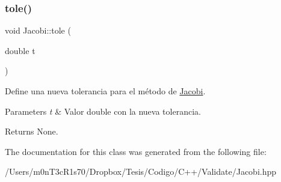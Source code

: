\subsubsection{\texorpdfstring{tole()}{tole()}}
{\footnotesize\ttfamily void Jacobi\+::tole (\begin{DoxyParamCaption}\item[{double}]{t }\end{DoxyParamCaption})\hspace{0.3cm}{\ttfamily [inline]}}



Define una nueva tolerancia para el método de \hyperlink{class_jacobi}{Jacobi}. 


\begin{DoxyParams}{Parameters}
{\em t} & Valor double con la nueva tolerancia. \\
\hline
\end{DoxyParams}
\begin{DoxyReturn}{Returns}
None. 
\end{DoxyReturn}


The documentation for this class was generated from the following file\+:\begin{DoxyCompactItemize}
\item 
/\+Users/m0n\+T3c\+R1s70/\+Dropbox/\+Tesis/\+Codigo/\+C++/\+Validate/Jacobi.\+hpp\end{DoxyCompactItemize}
